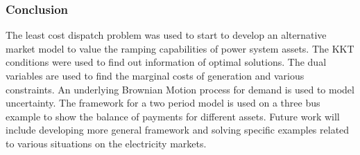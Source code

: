 \subsubsection{Conclusion}
The least cost dispatch problem was used to start to develop an alternative market model to value the ramping capabilities of power system assets.  The KKT conditions were used to find out information of optimal solutions.  The dual variables are used to find the marginal costs of generation and various constraints.  An underlying Brownian Motion process for demand is used to model uncertainty.  The framework for a two period model is used on a three bus example to show the balance of payments for different assets.  Future work will include developing more general framework and solving specific examples related to various situations on the electricity markets.

